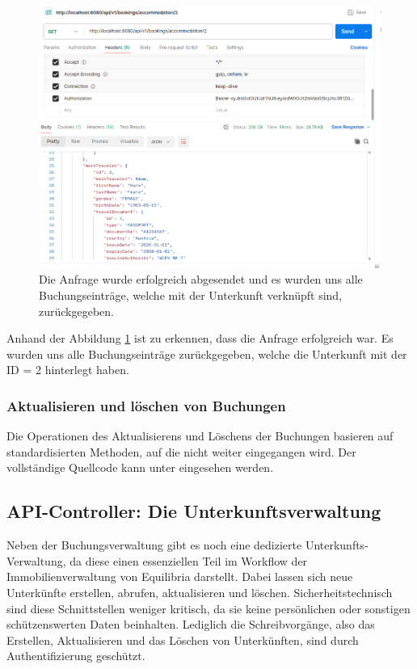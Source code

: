 		\begin{figure}
			\centering
			\includegraphics[width=1\textwidth]{images/impl-new-booking-get-acc-req.png}
			\caption{Die Anfrage wurde erfolgreich abgesendet und es wurden uns alle Buchungseinträge, welche mit der Unterkunft verknüpft sind, zurückgegeben.}
            \label{impl-new-booking-get-acc}
		\end{figure}
		
		Anhand der Abbildung \ref{impl-new-booking-get-acc} ist zu erkennen, dass die Anfrage erfolgreich war. Es wurden uns alle Buchungseinträge zurückgegeben, welche die Unterkunft mit der ID = 2 hinterlegt haben.
		
		\subsubsection{Aktualisieren und löschen von Buchungen}
		
		Die Operationen des Aktualisierens und Löschens der Buchungen basieren auf standardisierten Methoden, auf die nicht weiter eingegangen wird. Der vollständige Quellcode kann unter \cite{website-git-backend-repo} eingesehen werden.
		
		\subsection{API-Controller: Die Unterkunftsverwaltung}
		
		Neben der Buchungsverwaltung gibt es noch eine dedizierte Unterkunfts-Verwaltung, da diese einen essenziellen Teil im Workflow der Immobilienverwaltung von Equilibria darstellt. Dabei lassen sich neue Unterkünfte erstellen, abrufen, aktualisieren und löschen. Sicherheitstechnisch sind diese Schnittstellen weniger kritisch, da sie keine persönlichen oder sonstigen schützenswerten Daten beinhalten. Lediglich die Schreibvorgänge, also das Erstellen, Aktualisieren und das Löschen von Unterkünften, sind durch Authentifizierung geschützt. 
		
